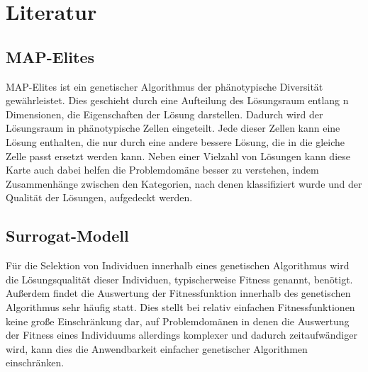 \documentclass[12pt]{article}
\begin{document}
\section{Literatur}

\subsection{MAP-Elites}
\label{sub:mapElites}
MAP-Elites \cite{Mouret.4202015} ist ein genetischer Algorithmus der phänotypische Diversität gewährleistet.
Dies geschieht durch eine Aufteilung des Lösungsraum entlang n Dimensionen, die Eigenschaften der Lösung darstellen.
Dadurch wird der Lösungsraum in phänotypische Zellen eingeteilt.
Jede dieser Zellen kann eine Lösung enthalten, die nur durch eine andere bessere Lösung, die in die gleiche Zelle passt ersetzt werden kann.
Neben einer Vielzahl von Lösungen kann diese Karte auch dabei helfen die Problemdomäne besser zu verstehen, indem Zusammenhänge zwischen den Kategorien, nach denen klassifiziert wurde und der Qualität der Lösungen, aufgedeckt werden.

\subsection{Surrogat-Modell}
\label{sub:surrogate}
Für die Selektion von Individuen innerhalb eines genetischen Algorithmus wird die Lösungsqualität dieser Individuen, typischerweise Fitness genannt, benötigt.
Außerdem findet die Auswertung der Fitnessfunktion innerhalb des genetischen Algorithmus sehr häufig statt.
Dies stellt bei relativ einfachen Fitnessfunktionen keine große Einschränkung dar, auf Problemdomänen in denen die Auswertung der Fitness eines Individuums allerdings komplexer und dadurch zeitaufwändiger wird, kann dies die Anwendbarkeit einfacher genetischer Algorithmen einschränken.
\end{document}
